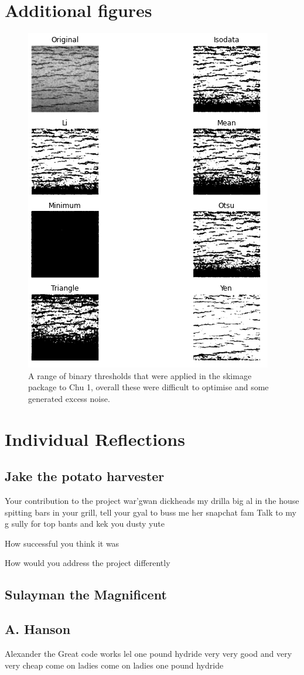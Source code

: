 \documentclass{article}
\begin{document}
\newpage



\newpage
\appendix
\section{Additional figures}

\begin{figure}[h]
	    \centering
	    \includegraphics[scale=0.7]{Figures/skimage_thresholds.png}
	    \caption{A range of binary thresholds that were applied in the skimage package to Chu 1, overall these were difficult to optimise and some generated excess noise.}
	    \label{fig:skimage_threshold}
	\end{figure}
	
\section{Individual Reflections}
\subsection{Jake the potato harvester}
Your contribution to the project
war'gwan dickheads my drilla big al in the house spitting bars in your grill, tell your gyal to buss me her snapchat fam
Talk to my g sully for top bants and kek you dusty yute

How successful you think it was

How would you address the project differently
\subsection{Sulayman the Magnificent}

\subsection{A. Hanson}
Alexander the Great
code works
lel
one pound hydride
very very good and very very cheap
come on ladies
come on ladies
one pound hydride
\end{document}
